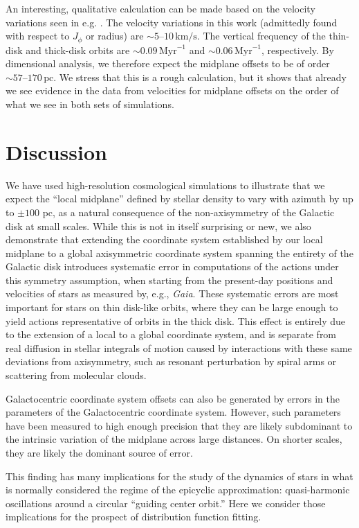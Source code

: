 \documentclass[twocolumn]{aastex62}
\newcommand{\pc}{\text{pc}}
\newcommand{\Myr}{\text{Myr}}
\newcommand{\kms}{\text{km}/\text{s}}
\begin{document}
An interesting, qualitative calculation can be made based on the velocity
variations seen in e.g. \citet{2019arXiv190209569F}. The velocity variations
in this work (admittedly found with respect to $J_{\phi}$ or radius) are
$\sim5\text{--}10\,\kms$. The vertical frequency of the thin-disk and
thick-disk orbits are $\sim 0.09\,\Myr^{-1}$ and $\sim0.06\,\Myr^{-1}$,
respectively. By dimensional analysis, we therefore expect the midplane
offsets to be of order $\sim 57\text{--}170\,\pc$. We stress that this is a
rough calculation, but it shows that already we see evidence in the data from
velocities for midplane offsets on the order of what we see in both sets of
simulations.

\section{Discussion} \label{sec:discussion}
We have used high-resolution cosmological simulations to illustrate that we
expect the ``local midplane'' defined by stellar density to vary with azimuth
by up to $\pm 100$ pc, as a natural consequence of the non-axisymmetry of the
Galactic disk at small scales. While this is not in itself surprising or new,
we also demonstrate that extending the coordinate system established by our
local midplane to a global axisymmetric coordinate system spanning the
entirety of the Galactic disk introduces systematic error in computations of
the actions under this symmetry assumption, when starting from the present-day
positions and velocities of stars as measured by, e.g., \emph{Gaia}. These
systematic errors are most important for stars on thin disk-like orbits, where
they can be large enough to yield actions representative of orbits in the
thick disk. This effect is entirely due to the extension of a local to a
global coordinate system, and is separate from real diffusion in stellar
integrals of motion caused by interactions with these same deviations from
axisymmetry, such as resonant perturbation by spiral arms or scattering from
molecular clouds.

Galactocentric coordinate system offsets can also be generated by errors in
the parameters of the Galactocentric coordinate system. However, such
parameters have been measured to high enough precision that they are likely
subdominant to the intrinsic variation of the midplane across large distances.
On shorter scales, they are likely the dominant source of error.

This finding has many implications for the study of the dynamics of stars in
what is normally considered the regime of the epicyclic approximation:
quasi-harmonic oscillations around a circular ``guiding center orbit.'' Here
we consider those implications for the prospect of distribution function
fitting.
\end{document}
